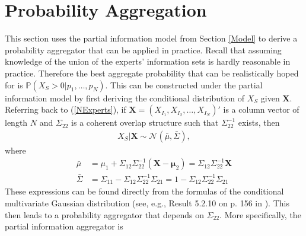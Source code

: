 \documentclass[11pt]{article}
\renewcommand{\P}{\mathbb{P}}
\theoremstyle{definition}
\theoremstyle{definition}
\begin{document}
%
%




\section{Probability Aggregation}
This section uses the partial information model from Section \ref{Model} to derive a probability aggregator that can be applied in practice. Recall that assuming knowledge of the union of the experts' information sets is hardly reasonable in practice. Therefore the best aggregate probability that can be realistically hoped for is  $\P(X_{S} > 0 | p_1, \dots, p_N)$.  This can be constructed under the partial information model by first deriving the conditional distribution of $X_S$ given $\boldsymbol{X}$. Referring back to (\ref{NExperts}), if $\boldsymbol{X} = (X_{I_1}, X_{I_2},  \dots, X_{I_N})'$ is a column vector of length $N$ and $\Sigma_{22}$ is a coherent overlap structure such that $\Sigma_{22}^{-1}$ exists, then 
\begin{align*}
X_{S} | \boldsymbol{X} \sim \mathcal{N}\left(\bar{\mu}, \bar{\Sigma}\right), 
\end{align*}
where
\begin{align*}
\bar{\mu} &= \mu_1 + \Sigma_{12} \Sigma_{22}^{-1} (\boldsymbol{X} - \boldsymbol{\mu}_2) =  \Sigma_{12} \Sigma_{22}^{-1} \boldsymbol{X} \\
 \bar{\Sigma}&= \Sigma_{11} - \Sigma_{12} \Sigma_{22}^{-1} \Sigma_{21} =1 - \Sigma_{12} \Sigma_{22}^{-1} \Sigma_{21}  
\end{align*}
These expressions can be found directly from the formulas of the conditional multivariate Gaussian distribution (see, e.g., Result 5.2.10 on p. 156 in \citet{ravishanker2001first}). This then leads to a probability aggregator that depends on $\Sigma_{22}$. More specifically, the partial information aggregator is
\end{document}
